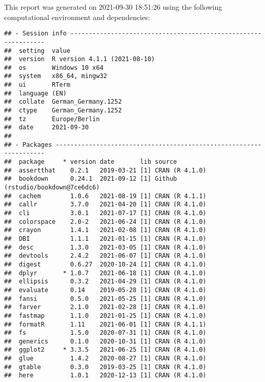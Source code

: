 \documentclass[
  12pt,
]{article}
\begin{document}
This report was generated on 2021-09-30 18:51:26 using the following computational environment and dependencies:

\begin{verbatim}
## - Session info ---------------------------------------------------------------
##  setting  value                       
##  version  R version 4.1.1 (2021-08-10)
##  os       Windows 10 x64              
##  system   x86_64, mingw32             
##  ui       RTerm                       
##  language (EN)                        
##  collate  German_Germany.1252         
##  ctype    German_Germany.1252         
##  tz       Europe/Berlin               
##  date     2021-09-30                  
## 
## - Packages -------------------------------------------------------------------
##  package     * version date       lib source                           
##  assertthat    0.2.1   2019-03-21 [1] CRAN (R 4.1.0)                   
##  bookdown      0.24.1  2021-09-12 [1] Github (rstudio/bookdown@7ce6dc6)
##  cachem        1.0.6   2021-08-19 [1] CRAN (R 4.1.1)                   
##  callr         3.7.0   2021-04-20 [1] CRAN (R 4.1.0)                   
##  cli           3.0.1   2021-07-17 [1] CRAN (R 4.1.0)                   
##  colorspace    2.0-2   2021-06-24 [1] CRAN (R 4.1.0)                   
##  crayon        1.4.1   2021-02-08 [1] CRAN (R 4.1.0)                   
##  DBI           1.1.1   2021-01-15 [1] CRAN (R 4.1.0)                   
##  desc          1.3.0   2021-03-05 [1] CRAN (R 4.1.0)                   
##  devtools      2.4.2   2021-06-07 [1] CRAN (R 4.1.0)                   
##  digest        0.6.27  2020-10-24 [1] CRAN (R 4.1.0)                   
##  dplyr       * 1.0.7   2021-06-18 [1] CRAN (R 4.1.0)                   
##  ellipsis      0.3.2   2021-04-29 [1] CRAN (R 4.1.0)                   
##  evaluate      0.14    2019-05-28 [1] CRAN (R 4.1.0)                   
##  fansi         0.5.0   2021-05-25 [1] CRAN (R 4.1.0)                   
##  farver        2.1.0   2021-02-28 [1] CRAN (R 4.1.0)                   
##  fastmap       1.1.0   2021-01-25 [1] CRAN (R 4.1.0)                   
##  formatR       1.11    2021-06-01 [1] CRAN (R 4.1.1)                   
##  fs            1.5.0   2020-07-31 [1] CRAN (R 4.1.0)                   
##  generics      0.1.0   2020-10-31 [1] CRAN (R 4.1.0)                   
##  ggplot2     * 3.3.5   2021-06-25 [1] CRAN (R 4.1.0)                   
##  glue          1.4.2   2020-08-27 [1] CRAN (R 4.1.0)                   
##  gtable        0.3.0   2019-03-25 [1] CRAN (R 4.1.0)                   
##  here          1.0.1   2020-12-13 [1] CRAN (R 4.1.0)                   

\end{verbatim}
\end{document}
